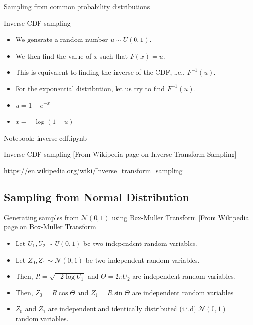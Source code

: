 \documentclass{beamer}
\begin{document}
\begin{section}{Sampling from common probability distributions}
       
   \begin{frame}{Inverse CDF sampling}


        \begin{itemize}
    
            \item We generate a random number $u \sim U(0, 1)$.
            \item \pause We then find the value of $x$ such that $F(x) = u$.
    \item \pause This is equivalent to finding the inverse of the CDF, i.e., $F^{-1}(u)$.
        \item \pause For the exponential distribution, let us try to find $F^{-1}(u)$.
        \item \pause  $u = 1 - e^{-x}$
        
        \item \pause 
            $x = -\log(1 - u)$
        
    \end{itemize}
        
    
\end{frame}

\begin{frame}
    Notebook: inverse-cdf.ipynb
\end{frame}

\begin{frame}{Inverse CDF sampling}
    [From Wikipedia page on Inverse Transform Sampling]

    \url{https://en.wikipedia.org/wiki/Inverse_transform_sampling}

\end{frame}

\subsection{Sampling from Normal Distribution}
\begin{frame}{Generating samples from $\mathcal{N}(0, 1)$ using Box-Muller Transform}
    [From Wikipedia page on Box-Muller Transform]
    \begin{itemize}
        \item Let $U_1, U_2 \sim U(0, 1)$ be two independent random variables.
        \item \pause Let $Z_0, Z_1 \sim \mathcal{N}(0, 1)$ be two independent random variables.
        \item \pause Then, $R = \sqrt{-2 \log U_1}$ and $\Theta = 2 \pi U_2$ are independent random variables.
        \item \pause Then, $Z_0 = R \cos \Theta$ and $Z_1 = R \sin \Theta$ are independent random variables.
        \item \pause $Z_0$ and $Z_1$ are independent and identically distributed (i.i.d) $\mathcal{N}(0, 1)$ random variables.
    \end{itemize}
    

\end{frame}
\end{section}
\end{document}
